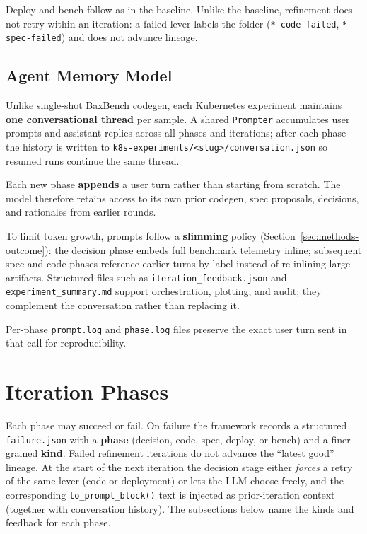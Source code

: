 Deploy and bench follow as in the baseline.  Unlike the baseline,
refinement does not retry within an iteration: a failed lever labels the folder
(\texttt{*-code-failed}, \texttt{*-spec-failed}) and does not advance lineage.


\subsection{Agent Memory Model}

Unlike single-shot BaxBench codegen, each Kubernetes experiment maintains
\textbf{one conversational thread} per sample.  A shared \texttt{Prompter}
accumulates user prompts and assistant replies across all phases and iterations;
after each phase the history is written to
\texttt{k8s-experiments/<slug>/conversation.json} so resumed runs continue
the same thread.

Each new phase \textbf{appends} a user turn rather than starting from scratch.
The model therefore retains access to its own prior codegen, spec proposals,
decisions, and rationales from earlier rounds.

To limit token growth, prompts follow a \textbf{slimming} policy
(Section~\ref{sec:methods-outcome}): the decision phase embeds full benchmark
telemetry inline; subsequent spec and code phases reference earlier turns by
label instead of re-inlining large artifacts.  Structured files such as
\texttt{iteration\_feedback.json} and \texttt{experiment\_summary.md} support
orchestration, plotting, and audit; they complement the conversation rather
than replacing it.

Per-phase \texttt{prompt.log} and \texttt{phase.log} files preserve the exact
user turn sent in that call for reproducibility.


\section{Iteration Phases}
\label{sec:methods-phases}

Each phase may succeed or fail.  On failure the framework records a structured
\texttt{failure.json} with a \textbf{phase} (decision, code, spec, deploy, or
bench) and a finer-grained \textbf{kind}.  Failed refinement iterations do not
advance the ``latest good'' lineage.  At the start of the next iteration the
decision stage either \emph{forces} a retry of the same lever (code or
deployment) or lets the LLM choose freely, and the corresponding
\texttt{to\_prompt\_block()} text is injected as prior-iteration context
(together with conversation history).  The subsections below name the kinds
and feedback for each phase.


